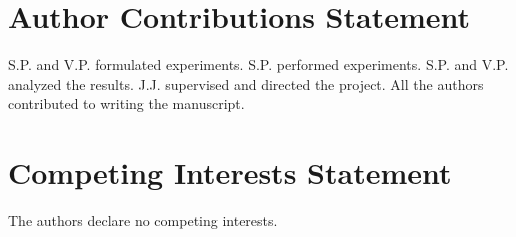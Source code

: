 \documentclass[fleqn,10pt]{wlscirep}
\begin{document}
\section*{Author Contributions Statement}
S.P. and V.P. formulated experiments. S.P. performed experiments. S.P. and V.P. analyzed the results. J.J. supervised and directed the project. All the authors contributed to writing the manuscript.

\section*{Competing Interests Statement}
The authors declare no competing interests.


\end{document}

